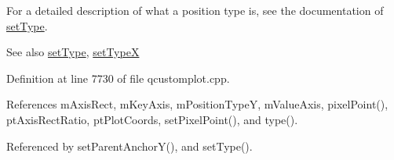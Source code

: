 For a detailed description of what a position type is, see the documentation of \hyperlink{class_q_c_p_item_position_aa476abf71ed8fa4c537457ebb1a754ad}{set\+Type}.

\begin{DoxySeeAlso}{See also}
\hyperlink{class_q_c_p_item_position_aa476abf71ed8fa4c537457ebb1a754ad}{set\+Type}, \hyperlink{class_q_c_p_item_position_a2113b2351d6d00457fb3559a4e20c3ea}{set\+Type\+X} 
\end{DoxySeeAlso}


Definition at line 7730 of file qcustomplot.\+cpp.



References m\+Axis\+Rect, m\+Key\+Axis, m\+Position\+Type\+Y, m\+Value\+Axis, pixel\+Point(), pt\+Axis\+Rect\+Ratio, pt\+Plot\+Coords, set\+Pixel\+Point(), and type().



Referenced by set\+Parent\+Anchor\+Y(), and set\+Type().


